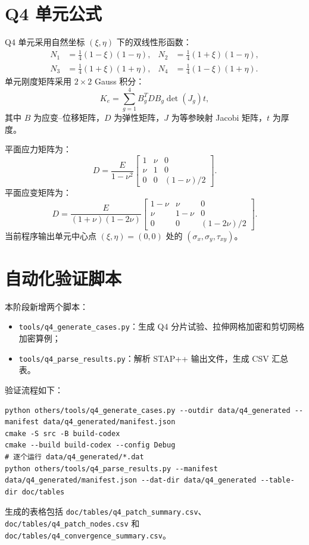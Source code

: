 ﻿\documentclass[UTF8,11pt,a4paper]{ctexart}
\begin{document}
\section{Q4 单元公式}
Q4 单元采用自然坐标 $(\xi,\eta)$ 下的双线性形函数：
\begin{align}
N_1 &= \frac{1}{4}(1-\xi)(1-\eta), &
N_2 &= \frac{1}{4}(1+\xi)(1-\eta),\\
N_3 &= \frac{1}{4}(1+\xi)(1+\eta), &
N_4 &= \frac{1}{4}(1-\xi)(1+\eta).
\end{align}
单元刚度矩阵采用 $2\times2$ Gauss 积分：
\begin{equation}
K_e = \sum_{g=1}^{4} B_g^T D B_g \det(J_g)t,
\end{equation}
其中 $B$ 为应变--位移矩阵，$D$ 为弹性矩阵，$J$ 为等参映射 Jacobi 矩阵，$t$ 为厚度。

平面应力矩阵为：
\begin{equation}
D = \frac{E}{1-\nu^2}
\begin{bmatrix}
1 & \nu & 0\\
\nu & 1 & 0\\
0 & 0 & (1-\nu)/2
\end{bmatrix}.
\end{equation}
平面应变矩阵为：
\begin{equation}
D = \frac{E}{(1+\nu)(1-2\nu)}
\begin{bmatrix}
1-\nu & \nu & 0\\
\nu & 1-\nu & 0\\
0 & 0 & (1-2\nu)/2
\end{bmatrix}.
\end{equation}
当前程序输出单元中心点 $(\xi,\eta)=(0,0)$ 处的 $(\sigma_x,\sigma_y,\tau_{xy})$。

\section{自动化验证脚本}
本阶段新增两个脚本：
\begin{itemize}
  \item \texttt{tools/q4\_generate\_cases.py}：生成 Q4 分片试验、拉伸网格加密和剪切网格加密算例；
  \item \texttt{tools/q4\_parse\_results.py}：解析 STAP++ 输出文件，生成 CSV 汇总表。
\end{itemize}
验证流程如下：
\begin{lstlisting}
python others/tools/q4_generate_cases.py --outdir data/q4_generated --manifest data/q4_generated/manifest.json
cmake -S src -B build-codex
cmake --build build-codex --config Debug
# 逐个运行 data/q4_generated/*.dat
python others/tools/q4_parse_results.py --manifest data/q4_generated/manifest.json --dat-dir data/q4_generated --table-dir doc/tables
\end{lstlisting}
生成的表格包括 \texttt{doc/tables/q4\_patch\_summary.csv}、\texttt{doc/tables/q4\_patch\_nodes.csv} 和 \texttt{doc/tables/q4\_convergence\_summary.csv}。
\end{document}

